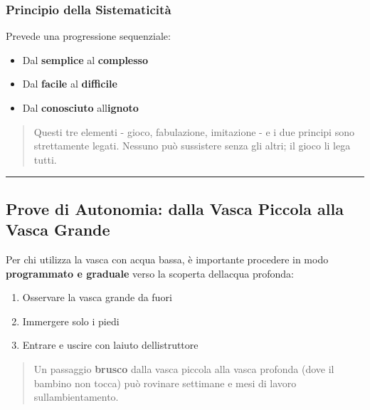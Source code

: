 \documentclass[a4paper,11pt]{article}
\providecommand{\tightlist}{%
  \setlength{\itemsep}{0pt}\setlength{\parskip}{0pt}}
\begin{document}
\subsubsection{Principio della
      Sistematicità}\label{principio-della-sistematicituxe0}

Prevede una progressione sequenziale:

\begin{itemize}
      \tightlist
      \item
            Dal \textbf{semplice} al \textbf{complesso}
      \item
            Dal \textbf{facile} al \textbf{difficile}
      \item
            Dal \textbf{conosciuto} all\textquotesingle{}\textbf{ignoto}
\end{itemize}

\begin{quote}
      Questi tre elementi - gioco, fabulazione, imitazione - e i due principi
      sono strettamente legati. Nessuno può sussistere senza gli altri; il
      gioco li lega tutti.
\end{quote}

\begin{center}\rule{0.5\linewidth}{0.5pt}\end{center}

\subsection{Prove di Autonomia: dalla Vasca Piccola alla Vasca
      Grande}\label{prove-di-autonomia-dalla-vasca-piccola-alla-vasca-grande}

Per chi utilizza la vasca con acqua bassa, è importante procedere in
modo \textbf{programmato e graduale} verso la scoperta
dell\textquotesingle acqua profonda:

\begin{enumerate}
      \tightlist
      \item
            Osservare la vasca grande da fuori
      \item
            Immergere solo i piedi
      \item
            Entrare e uscire con l\textquotesingle aiuto
            dell\textquotesingle istruttore
\end{enumerate}

\begin{quote}
      Un passaggio \textbf{brusco} dalla vasca piccola alla vasca profonda
      (dove il bambino non tocca) può rovinare settimane e mesi di lavoro
      sull\textquotesingle ambientamento.
\end{quote}
\end{document}
